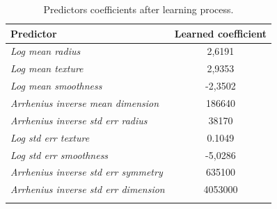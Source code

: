 \begin{longtable}{l | c}
	\centering
	Predictor & Learned coefficient \\
	\hline
	\textit{Log mean radius} & 2,6191 \\
	\textit{Log mean texture} & 2,9353 \\
	\textit{Log mean smoothness} & -2,3502 \\
	\textit{Arrhenius inverse mean dimension} & 186640 \\
	\textit{Arrhenius inverse std err radius} & 38170 \\
	\textit{Log std err texture} & 0.1049 \\
	\textit{Log std err smoothness} & -5,0286 \\
	\textit{Arrhenius inverse std err symmetry} & 635100 \\
	\textit{Arrhenius inverse std err dimension} & 4053000 \\
	\caption{Predictors coefficients after learning process.}
	\label{svm:1}
\end{longtable} 

